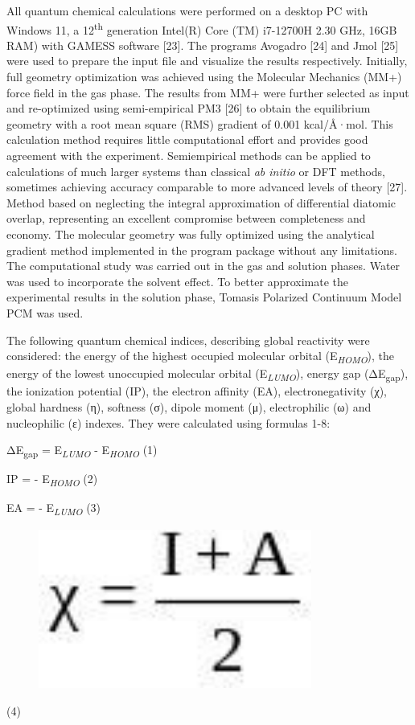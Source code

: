 All quantum chemical calculations were performed on a desktop PC with
Windows 11, a 12\textsuperscript{th} generation Intel(R) Core (TM)
i7-12700H 2.30 GHz, 16GB RAM) with GAMESS software {[}23{]}. The
programs Avogadro {[}24{]} and Jmol {[}25{]} were used to prepare the
input file and visualize the results respectively. Initially, full
geometry optimization was achieved using the Molecular Mechanics (MM+)
force field in the gas phase. The results from MM+ were further selected
as input and re-optimized using semi-empirical PM3 {[}26{]} to obtain
the equilibrium geometry with a root mean square (RMS) gradient of 0.001
kcal/Å·mol. This calculation method requires little computational effort
and provides good agreement with the experiment. Semiempirical methods
can be applied to calculations of much larger systems than classical
\emph{ab initio} or DFT methods, sometimes achieving accuracy comparable
to more advanced levels of theory {[}27{]}. Method based on neglecting
the integral approximation of differential diatomic overlap,
representing an excellent compromise between completeness and economy.
The molecular geometry was fully optimized using the analytical gradient
method implemented in the program package without any limitations. The
computational study was carried out in the gas and solution phases.
Water was used to incorporate the solvent effect. To better approximate
the experimental results in the solution phase, Tomasi\textquotesingle s
Polarized Continuum Model PCM was used.

The following quantum chemical indices, describing global reactivity
were considered: the energy of the highest occupied molecular orbital
(E\emph{\textsubscript{HOMO}}), the energy of the lowest unoccupied
molecular orbital (E\emph{\textsubscript{LUMO}}), energy gap
(ΔE\textsubscript{gap}), the ionization potential (IP), the electron
affinity (EA), electronegativity (χ), global hardness (η), softness (σ),
dipole moment (μ), electrophilic (ω) and nucleophilic (ε) indexes. They
were calculated using formulas 1-8:

ΔE\textsubscript{gap} = E\emph{\textsubscript{LUMO}} -
E\emph{\textsubscript{HOMO}} (1)

IP = - E\emph{\textsubscript{HOMO}} (2)

EA = - E\emph{\textsubscript{LUMO}} (3)

\begin{figure}[H]
	\centering
	\includegraphics[width=0.8\textwidth]{assets/32}
	\caption*{}
\end{figure} (4)

